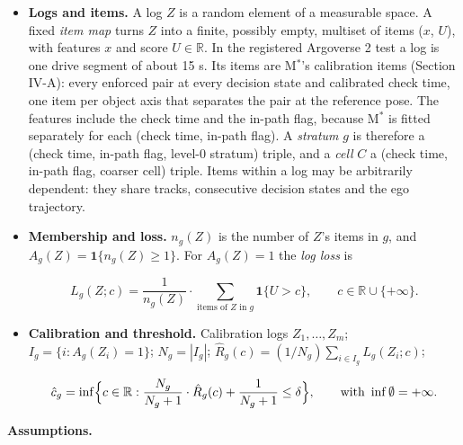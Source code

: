 \documentclass{ieeeaccess}
\begin{document}
\begin{itemize}
\item \textbf{Logs and items.} A log $Z$ is a random element of a measurable space. A fixed \emph{item map} turns $Z$ into a finite, possibly empty, multiset of items ($x$, $U$), with features $x$ and score $U \in \mathbb{R}$. In the registered Argoverse 2 test a log is one drive segment of about 15 s. Its items are M$^{*}$'s calibration items (Section IV-A): every enforced pair at every decision state and calibrated check time, one item per object axis that separates the pair at the reference pose. The features include the check time and the in-path flag, because M$^{*}$ is fitted separately for each (check time, in-path flag). A \emph{stratum} $g$ is therefore a (check time, in-path flag, level-0 stratum) triple, and a \emph{cell} $C$ a (check time, in-path flag, coarser cell) triple. Items within a log may be arbitrarily dependent: they share tracks, consecutive decision states and the ego trajectory.
\item \textbf{Membership and loss.} $n_{g}(Z)$ is the number of $Z$'s items in $g$, and $A_{g}(Z) = \mathbf{1}\{n_{g}(Z) \geq 1\}$. For $A_{g}(Z) = 1$ the \emph{log loss} is

\begin{equation*}
L_g(Z; c) = \frac{1}{n_g(Z)}\cdot\sum_{\text{items of } Z \text{ in } g} \mathbf{1}\{U > c\}, \qquad c \in \mathbb{R} \cup \{+\infty\}.
\end{equation*}
\item \textbf{Calibration and threshold.} Calibration logs $Z_{1}, \dots, Z_{m}$; $I_{g} = \{i : A_{g}(Z_{i}) = 1\}$; $N_{g} = |I_{g}|$; $\hat{R}_{g}(c) = (1/N_{g})\sum_{i\in I_{g}} L_{g}(Z_{i}; c)$;

\begin{equation*}
\hat{c}_g = \inf\Bigl\{c \in \mathbb{R} : \frac{N_g}{N_g + 1}\cdot\hat{R}_g(c) + \frac{1}{N_g + 1} \leq \delta\Bigr\}, \qquad \text{with } \inf\emptyset = +\infty.
\end{equation*}
\end{itemize}

\textbf{Assumptions.}
\end{document}
